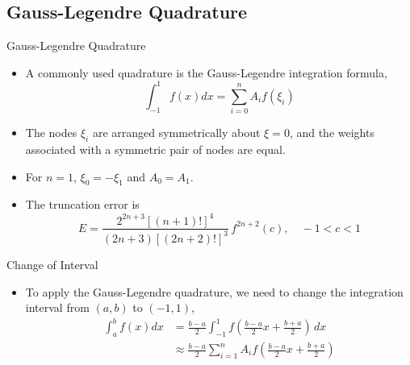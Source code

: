 \documentclass{beamer}
\begin{document}
\subsection[Gauss-Legendre Quadrature]{Gauss-Legendre Quadrature}
\begin{frame}{Gauss-Legendre Quadrature}
\begin{itemize}
\item A commonly used quadrature is the Gauss-Legendre integration formula, 
\[
\int_{-1}^1 f(x) dx = \sum_{i=0}^n A_i f(\xi_i)
\]
\item The nodes $\xi_i$ are arranged symmetrically about $\xi=0$, and the weights associated with a
symmetric pair of nodes are equal. 
\item For $n=1$, $\xi_0=-\xi_1$ and $A_0=A_1$.
\item The truncation error is 
\[
E=\frac{2^{2n+3}[(n+1)!]^4}{(2n+3)[(2n+2)!]^3}\,f^{2n+2}(c), \quad -1<c<1
\]
\end{itemize}
\end{frame}
\begin{frame}{Change of Interval}
\begin{itemize}
\item To apply the Gauss-Legendre quadrature, we need to change the integration interval from $(a,b)$ to $(-1,1)$,
\begin{align*}
\int_a^b f(x) dx &=\frac{b-a}{2}\int_{-1}^1 f\left(\frac{b-a}{2}x+\frac{b+a}{2}\right)\,dx	\\
&\approx \frac{b-a}{2}\sum_{i=1}^n A_i  f\left(\frac{b-a}{2}x+\frac{b+a}{2}\right) 
\end{align*}
\end{itemize}
\end{frame}
\end{document}
